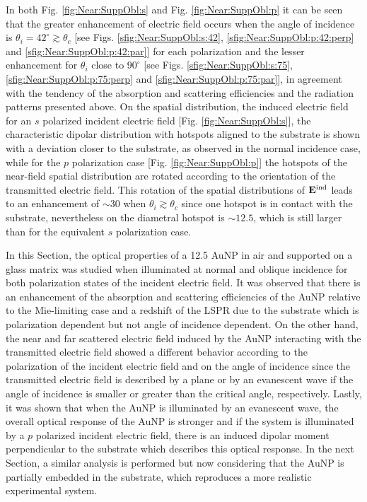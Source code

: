 In both Fig. \ref{fig:Near:SuppObl:s} and Fig. \ref{fig:Near:SuppObl:p} it can be seen that the greater enhancement of electric field occurs when the angle of incidence is $\theta_i = 42^ \circ \gtrsim \theta_c$ [see Figs. \ref{sfig:Near:SuppObl:s:42}, \ref{sfig:Near:SuppObl:p:42:perp} and \ref{sfig:Near:SuppObl:p:42:par}] for each polarization and the lesser enhancement for $\theta_i$ close to $90^\circ$ [see Figs. \ref{sfig:Near:SuppObl:s:75}, \ref{sfig:Near:SuppObl:p:75:perp} and \ref{sfig:Near:SuppObl:p:75:par}], in agreement with the tendency of the absorption and scattering efficiencies and the radiation patterns presented above. On the spatial distribution, the induced electric field for an $s$ polarized incident electric field [Fig. \ref{fig:Near:SuppObl:s}], the characteristic dipolar distribution with hotspots aligned to the substrate is shown with a deviation closer to the substrate, as observed in the normal incidence case, while for the $p$ polarization case [Fig. \ref{fig:Near:SuppObl:p}] the hotspots of the near-field spatial distribution are rotated according to the orientation of the transmitted electric field. This rotation of the spatial distributions of $\vb{E}^\text{ind}$ leads to an enhancement of $\sim 30$ when $\theta_i \gtrsim \theta_c$ since one hotspot is in contact with the substrate, nevertheless on the diametral hotspot is $\sim 12.5$, which is still larger than for the equivalent $s$ polarization case.

In this Section, the optical properties of a 12.5 AuNP in air and supported on a glass matrix was studied when illuminated at normal and oblique incidence for both polarization states of the incident electric field. It was observed that there is an enhancement of the absorption and scattering efficiencies of the AuNP relative to the Mie-limiting case and a redshift of the LSPR due to the substrate which is polarization dependent but not angle of incidence dependent. On the other hand, the near and far scattered electric field induced by the AuNP interacting with the transmitted electric field showed a different behavior according to the polarization of the incident electric field and on the angle of incidence since the transmitted electric field is described by a plane or by an evanescent wave if the angle of incidence is smaller or greater than the critical angle, respectively. Lastly, it was shown that when the AuNP is illuminated by an evanescent wave, the overall optical response of the AuNP is stronger and  if the system is illuminated by a $p$ polarized incident electric field, there is an induced dipolar moment perpendicular to the substrate which describes this optical response. In the next Section, a similar analysis is performed but now considering that the AuNP is partially embedded in the substrate, which reproduces a more realistic experimental system.
